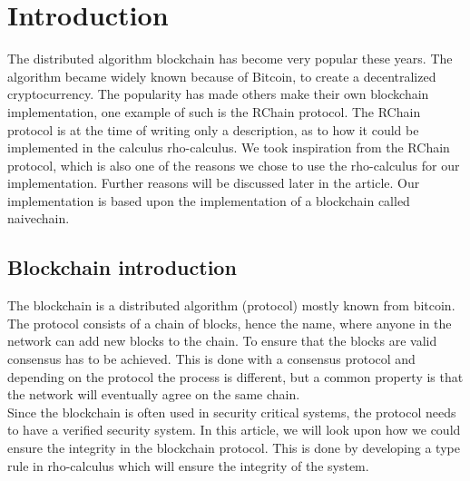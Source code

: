 \section{Introduction}
The distributed algorithm blockchain has become very popular these years. The algorithm became widely known because of Bitcoin, to create a decentralized cryptocurrency.\citep{website:blockchain} The popularity has made others make their own blockchain implementation, one example of such is the RChain protocol. The RChain protocol is at the time of writing only a description, as to how it could be implemented in the calculus rho-calculus. We took inspiration from the RChain protocol, which is also one of the reasons we chose to use the rho-calculus for our implementation. Further reasons will be discussed later in the article. Our implementation is based upon the implementation of a blockchain called naivechain\cite{naivechain}.

\subsection*{Blockchain introduction}
The blockchain is a distributed algorithm (protocol) mostly known from bitcoin. The protocol consists of a chain of blocks, hence the name, where anyone in the network can add new blocks to the chain. To ensure that the blocks are valid consensus has to be achieved. This is done with a consensus protocol and depending on the protocol the process is different, but a common property is that the network will eventually agree on the same chain.\\
Since the blockchain is often used in security critical systems, the protocol needs to have a verified security system.\cite{website:integrity} In this article, we will look upon how we could ensure the integrity in the blockchain protocol. This is done by developing a type rule in rho-calculus which will ensure the integrity of the system.
